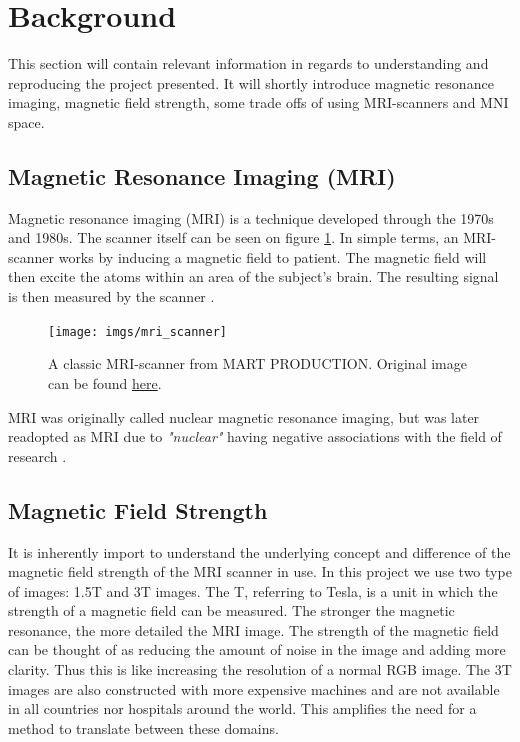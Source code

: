 \documentclass[12pt, fleqn, titlepage]{article}
\newcommand{\1}[1]{\mathds{1}\left[#1\right]}
\begin{document}
\section{Background}

This section will contain relevant information in regards to understanding and reproducing the project presented. It will shortly introduce magnetic resonance imaging, magnetic field strength, some trade offs of using MRI-scanners and MNI space. 

\subsection{Magnetic Resonance Imaging (MRI)}
Magnetic resonance imaging (MRI) is a technique developed through the 1970s and 1980s. The scanner itself can be seen on figure \ref{fig:mriscanner}. In simple terms, an MRI-scanner works by inducing a magnetic field to patient. The magnetic field will then excite the atoms within an area of the subject's brain. The resulting signal is then measured by the scanner \cite{mri}.  
\begin{figure}[H]
	\centering
	\texttt{[image: imgs/mri\_scanner]}
	\caption{A classic MRI-scanner from MART PRODUCTION. Original image can be found \href{https://www.pexels.com/photo/technology-hospital-medicine-indoors-7089017/}{here}. }
	\label{fig:mriscanner}
\end{figure}
\noindent
MRI was originally called nuclear magnetic resonance imaging, but was later readopted as MRI due to \textit{"nuclear"} having negative associations with the field of research \cite{wiki} \cite{mri2}.

\subsection{Magnetic Field Strength}
It is inherently import to understand the underlying concept and difference of the magnetic field strength of the MRI scanner in use. In this project we use two type of images: 1.5T and 3T images. The T, referring to Tesla, is a unit in which the strength of a magnetic field can be measured. The stronger the magnetic resonance, the more detailed the MRI image. The strength of the magnetic field can be thought of as reducing the amount of noise in the image and adding more clarity. Thus this is like increasing the resolution of a normal RGB image. The 3T images are also constructed with more expensive machines and are not available in all countries nor hospitals around the world. This amplifies the need for a method to translate between these domains. 
\end{document}

